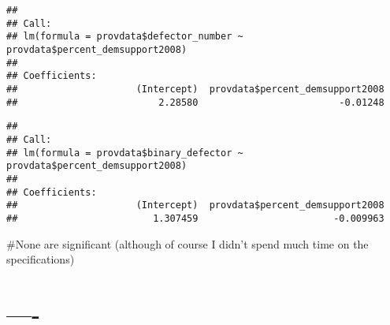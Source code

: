 \documentclass[]{article}
\newenvironment{Shaded}{\begin{snugshade}}{\end{snugshade}}
\newcommand{\KeywordTok}[1]{\textcolor[rgb]{0.13,0.29,0.53}{\textbf{#1}}}
\newcommand{\NormalTok}[1]{#1}
\newcommand{\OperatorTok}[1]{\textcolor[rgb]{0.81,0.36,0.00}{\textbf{#1}}}
\newcommand{\StringTok}[1]{\textcolor[rgb]{0.31,0.60,0.02}{#1}}
\begin{document}
\begin{verbatim}
## 
## Call:
## lm(formula = provdata$defector_number ~ provdata$percent_demsupport2008)
## 
## Coefficients:
##                     (Intercept)  provdata$percent_demsupport2008  
##                         2.28580                         -0.01248
\end{verbatim}

\begin{Shaded}
\end{Shaded}

\begin{verbatim}
## 
## Call:
## lm(formula = provdata$binary_defector ~ provdata$percent_demsupport2008)
## 
## Coefficients:
##                     (Intercept)  provdata$percent_demsupport2008  
##                        1.307459                        -0.009963
\end{verbatim}

\#None are significant (although of course I didn't spend much time on
the specifications)

\hypertarget{section-3}{%
\section{----}\label{section-3}}
\end{document}
